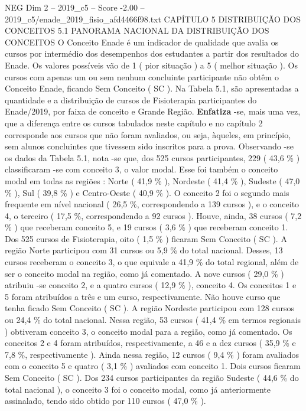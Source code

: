 \begin{textsample}{NEG Dim 2 – 2019\_c5 – Score -2.00 – 2019\_c5/enade\_2019\_fisio\_afd4466f98.txt}  \label{ex:f2_neg_100}
CAPÍTULO 5 DISTRIBUIÇÃO DOS CONCEITOS 5.1 PANORAMA NACIONAL DA DISTRIBUIÇÃO DOS CONCEITOS O Conceito Enade é um indicador de qualidade que avalia os cursos por intermédio dos desempenhos dos estudantes a partir dos resultados do Enade.
Os valores possíveis vão de 1 ( pior situação ) a 5 ( melhor situação ).
Os cursos com apenas um ou sem nenhum concluinte participante não obtêm o Conceito Enade, ficando Sem Conceito ( SC ).
Na Tabela 5.1, são apresentadas a quantidade e a distribuição de cursos de Fisioterapia participantes do Enade/2019, por faixa de conceito e Grande Região. \textbf{Enfatiza} -se, mais uma vez, que a diferença entre os cursos tabulados neste capítulo e no capítulo 2 corresponde aos cursos que não foram avaliados, ou seja, àqueles, em princípio, sem alunos concluintes que tivessem sido inscritos para a prova.
Observando -se os dados da Tabela 5.1, nota -se que, dos 525 cursos participantes, 229 ( 43,6 \% ) classificaram -se com conceito 3, o valor modal.
Esse foi também o conceito modal em todas as regiões : Norte ( 41,9 \% ), Nordeste ( 41,4 \% ), Sudeste ( 47,0 \% ), Sul ( 39,8 \% ) e Centro-Oeste ( 40,9 \% ).
O conceito 2 foi o segundo mais frequente em nível nacional ( 26,5 \%, correspondendo a 139 cursos ), e o conceito 4, o terceiro ( 17,5 \%, correspondendo a 92 cursos ).
Houve, ainda, 38 cursos ( 7,2 \% ) que receberam conceito 5, e 19 cursos ( 3,6 \% ) que receberam conceito 1.
Dos 525 cursos de Fisioterapia, oito ( 1,5 \% ) ficaram Sem Conceito ( SC ).
A região Norte participou com 31 cursos ou 5,9 \% do total nacional.
Desses, 13 cursos receberam o conceito 3, o que equivale a 41,9 \% do total regional, além de ser o conceito modal na região, como já comentado.
A nove cursos ( 29,0 \% ) atribuiu -se conceito 2, e a quatro cursos ( 12,9 \% ), conceito 4.
Os conceitos 1 e 5 foram atribuídos a três e um curso, respectivamente.
Não houve curso que tenha ficado Sem Conceito ( SC ).
A região Nordeste participou com 128 cursos ou 24,4 \% do total nacional.
Nessa região, 53 cursos ( 41,4 \% em termos regionais ) obtiveram conceito 3, o conceito modal para a região, como já comentado.
Os conceitos 2 e 4 foram atribuídos, respectivamente, a 46 e a dez cursos ( 35,9 \% e 7,8 \%, respectivamente ).
Ainda nessa região, 12 cursos ( 9,4 \% ) foram avaliados com o conceito 5 e quatro ( 3,1 \% ) avaliados com conceito 1.
Dois cursos ficaram Sem Conceito ( SC ).
Dos 234 cursos participantes da região Sudeste ( 44,6 \% do total nacional ), o conceito 3 foi o conceito modal, como já anteriormente assinalado, tendo sido obtido por 110 cursos ( 47,0 \% ).

\end{textsample}
